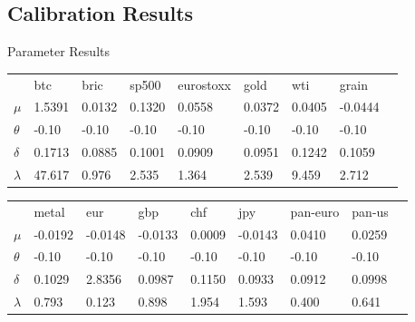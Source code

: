 \documentclass{beamer}
\begin{document}
\subsection{Calibration Results}
\begin{frame}{Parameter Results}
\begin{table}[]
\begin{tabular}{lllllllll}
     &btc	&bric	&sp500	&eurostoxx	&gold	&wti	&grain	\\
$\mu$ &1.5391	&0.0132	&0.1320	&0.0558	&0.0372	&0.0405	&-0.0444\\
$\theta$ &-0.10	&-0.10	&-0.10	&-0.10	&-0.10	&-0.10	&-0.10\\
$\delta$&0.1713	&0.0885	&0.1001	&0.0909	&0.0951	&0.1242	&0.1059 \\
$\lambda$&47.617	&0.976	&2.535	&1.364	&2.539	&9.459	&2.712	\\
\end{tabular}
\end{table}

\begin{table}[]
\begin{tabular}{lllllllll}
&metal	&eur	&gbp	&chf	&jpy	&pan-euro	&pan-us\\
$\mu$ &-0.0192	&-0.0148	&-0.0133	&0.0009	&-0.0143	&0.0410	&0.0259\\
$\theta$ &-0.10	&-0.10	&-0.10	&-0.10	&-0.10	&-0.10	&-0.10\\
$\delta$ &0.1029	&2.8356	&0.0987	&0.1150	&0.0933	&0.0912	&0.0998\\
$\lambda$ &0.793	&0.123	&0.898	&1.954	&1.593	&0.400	&0.641\\
\end{tabular}
\end{table} 
\end{frame}
\end{document}
